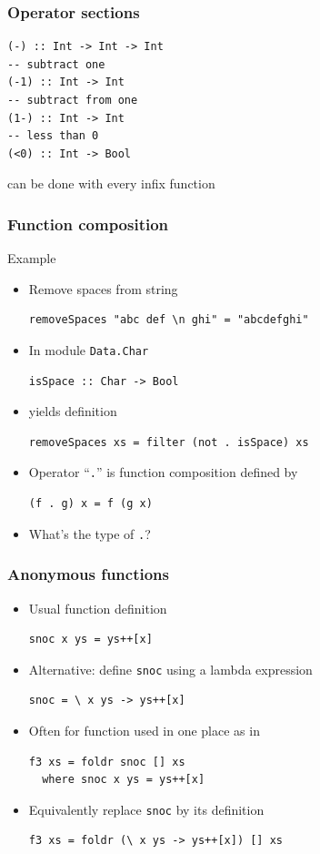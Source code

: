 \documentclass{beamer}
\begin{document}
\begin{frame}[fragile]
  \frametitle{Operator sections}
\begin{verbatim}
(-) :: Int -> Int -> Int
-- subtract one
(-1) :: Int -> Int
-- subtract from one
(1-) :: Int -> Int
-- less than 0
(<0) :: Int -> Bool
\end{verbatim}
  can be done with every infix function
\end{frame}
\begin{frame}[fragile]
  \frametitle{Function composition}
  \begin{block}{Example}
    \begin{itemize}
    \item Remove spaces from string
\begin{verbatim}
removeSpaces "abc def \n ghi" = "abcdefghi"
\end{verbatim}
    \item In module \texttt{Data.Char}
\begin{verbatim}
isSpace :: Char -> Bool
\end{verbatim}
    \item yields definition
\begin{verbatim}
removeSpaces xs = filter (not . isSpace) xs
\end{verbatim}
    \item Operator ``\texttt{.}'' is function composition defined by
\begin{verbatim}
(f . g) x = f (g x)
\end{verbatim}
    \item What's the type of \texttt{.}?
    \end{itemize}
  \end{block}
\end{frame}
\begin{frame}[fragile]
  \frametitle{Anonymous functions}
  \begin{itemize}
  \item<+-> Usual function definition
\begin{verbatim}
snoc x ys = ys++[x]
\end{verbatim}
  \item<+->
  Alternative: define \texttt{snoc} using a lambda expression
\begin{verbatim}
snoc = \ x ys -> ys++[x]
\end{verbatim}
\item<+->
  Often for function used in one place as in
\begin{verbatim}
f3 xs = foldr snoc [] xs
  where snoc x ys = ys++[x]
\end{verbatim}
\item<+-> Equivalently replace \texttt{snoc} by its definition
\begin{verbatim}
f3 xs = foldr (\ x ys -> ys++[x]) [] xs
\end{verbatim}
\end{itemize}
\end{frame}
\end{document}
